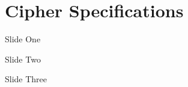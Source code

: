 \section{Cipher Specifications}

\begin{frame}{Slide One}

\end{frame}

\begin{frame}{Slide Two}

\end{frame}

\begin{frame}{Slide Three}

\end{frame}